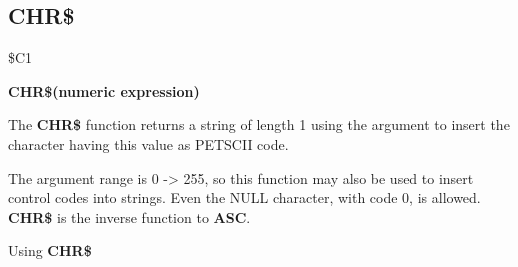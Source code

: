 
\newpage
\subsection{CHR\$}
\begin{description}[leftmargin=3cm,style=nextline]
\item [Token:] \$C1
\item [Format:] {\bf CHR\$(numeric expression)}
\item [Usage:] The {\bf CHR\$} function returns a string of length 1
               using the argument to insert the character having this
               value as PETSCII code.

\item [Remarks:] The argument range is 0 -> 255, so this function may
                 also be used to insert control codes into strings.
                 Even the NULL character, with code 0, is allowed. \\
               {\bf CHR\$} is the inverse function to {\bf ASC}.
\item [Example:] Using {\bf CHR\$}
\end{description}


\newpage
